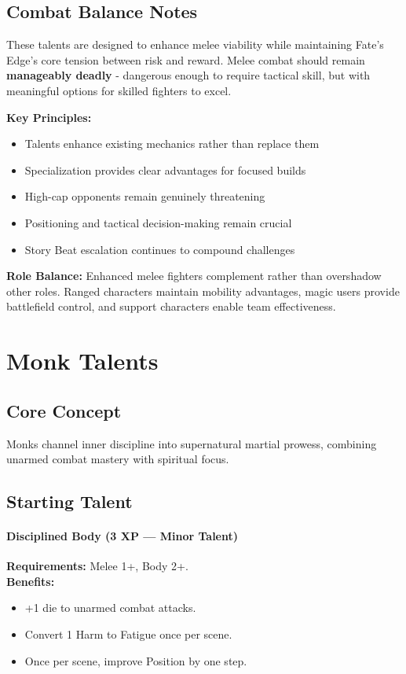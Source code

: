 \subsection{Combat Balance Notes}

These talents are designed to enhance melee viability while maintaining Fate's Edge's core tension between risk and reward. Melee combat should remain \textbf{manageably deadly} - dangerous enough to require tactical skill, but with meaningful options for skilled fighters to excel.

\textbf{Key Principles:}
\begin{itemize}
    \item Talents enhance existing mechanics rather than replace them
    \item Specialization provides clear advantages for focused builds
    \item High-cap opponents remain genuinely threatening
    \item Positioning and tactical decision-making remain crucial
    \item Story Beat escalation continues to compound challenges
\end{itemize}

\textbf{Role Balance:} Enhanced melee fighters complement rather than overshadow other roles. Ranged characters maintain mobility advantages, magic users provide battlefield control, and support characters enable team effectiveness.

\section{Monk Talents}
\label{sec:monk-talents}

\subsection*{Core Concept}
Monks channel inner discipline into supernatural martial prowess, combining unarmed combat mastery with spiritual focus.

\subsection*{Starting Talent}
\paragraph{Disciplined Body (3 XP --- Minor Talent)} 
\textbf{Requirements:} Melee 1+, Body 2+. \\
\textbf{Benefits:}
\begin{itemize}
  \item +1 die to unarmed combat attacks.
  \item Convert 1 Harm to Fatigue once per scene.
  \item Once per scene, improve Position by one step.
\end{itemize}

